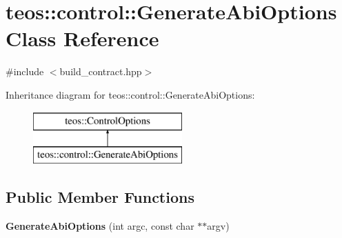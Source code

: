 \hypertarget{classteos_1_1control_1_1_generate_abi_options}{}\section{teos\+:\+:control\+:\+:Generate\+Abi\+Options Class Reference}
\label{classteos_1_1control_1_1_generate_abi_options}


{\ttfamily \#include $<$build\+\_\+contract.\+hpp$>$}

Inheritance diagram for teos\+:\+:control\+:\+:Generate\+Abi\+Options\+:\begin{figure}[H]
\begin{center}
\leavevmode
\includegraphics[height=2.000000cm]{classteos_1_1control_1_1_generate_abi_options}
\end{center}
\end{figure}
\subsection*{Public Member Functions}
\begin{DoxyCompactItemize}
\item 
\mbox{\label{classteos_1_1control_1_1_generate_abi_options_addfa748467e9f424013802106132924a}} 
{\bfseries Generate\+Abi\+Options} (int argc, const char $\ast$$\ast$argv)
\end{DoxyCompactItemize}
